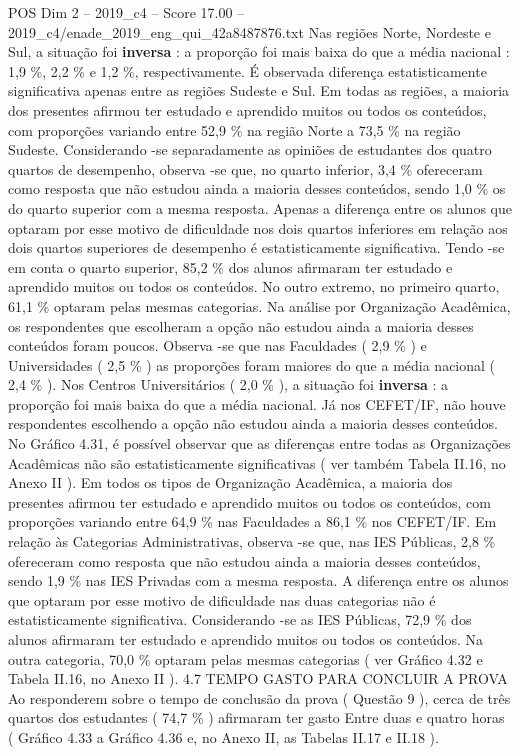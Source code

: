 \begin{textsample}{POS Dim 2 – 2019\_c4 – Score 17.00 – 2019\_c4/enade\_2019\_eng\_qui\_42a8487876.txt}
Nas regiões Norte, Nordeste e Sul, a situação foi \textbf{inversa} : a proporção foi mais baixa do que a média nacional : 1,9 \%, 2,2 \% e 1,2 \%, respectivamente.
É observada diferença estatisticamente significativa apenas entre as regiões Sudeste e Sul.
Em todas as regiões, a maioria dos presentes afirmou ter estudado e aprendido muitos ou todos os conteúdos, com proporções variando entre 52,9 \% na região Norte a 73,5 \% na região Sudeste.
Considerando -se separadamente as opiniões de estudantes dos quatro quartos de desempenho, observa -se que, no quarto inferior, 3,4 \% ofereceram como resposta que não estudou ainda a maioria desses conteúdos, sendo 1,0 \% os do quarto superior com a mesma resposta.
Apenas a diferença entre os alunos que optaram por esse motivo de dificuldade nos dois quartos inferiores em relação aos dois quartos superiores de desempenho é estatisticamente significativa.
Tendo -se em conta o quarto superior, 85,2 \% dos alunos afirmaram ter estudado e aprendido muitos ou todos os conteúdos.
No outro extremo, no primeiro quarto, 61,1 \% optaram pelas mesmas categorias.
Na análise por Organização Acadêmica, os respondentes que escolheram a opção não estudou ainda a maioria desses conteúdos foram poucos.
Observa -se que nas Faculdades ( 2,9 \% ) e Universidades ( 2,5 \% ) as proporções foram maiores do que a média nacional ( 2,4 \% ).
Nos Centros Universitários ( 2,0 \% ), a situação foi \textbf{inversa} : a proporção foi mais baixa do que a média nacional.
Já nos CEFET/IF, não houve respondentes escolhendo a opção não estudou ainda a maioria desses conteúdos.
No Gráfico 4.31, é possível observar que as diferenças entre todas as Organizações Acadêmicas não são estatisticamente significativas ( ver também Tabela II.16, no Anexo II ).
Em todos os tipos de Organização Acadêmica, a maioria dos presentes afirmou ter estudado e aprendido muitos ou todos os conteúdos, com proporções variando entre 64,9 \% nas Faculdades a 86,1 \% nos CEFET/IF.
Em relação às Categorias Administrativas, observa -se que, nas IES Públicas, 2,8 \% ofereceram como resposta que não estudou ainda a maioria desses conteúdos, sendo 1,9 \% nas IES Privadas com a mesma resposta.
A diferença entre os alunos que optaram por esse motivo de dificuldade nas duas categorias não é estatisticamente significativa.
Considerando -se as IES Públicas, 72,9 \% dos alunos afirmaram ter estudado e aprendido muitos ou todos os conteúdos.
Na outra categoria, 70,0 \% optaram pelas mesmas categorias ( ver Gráfico 4.32 e Tabela II.16, no Anexo II ). 4.7 TEMPO GASTO PARA CONCLUIR A PROVA Ao responderem sobre o tempo de conclusão da prova ( Questão 9 ), cerca de três quartos dos estudantes ( 74,7 \% ) afirmaram ter gasto Entre duas e quatro horas ( Gráfico 4.33 a Gráfico 4.36 e, no Anexo II, as Tabelas II.17 e II.18 ).

\end{textsample}
